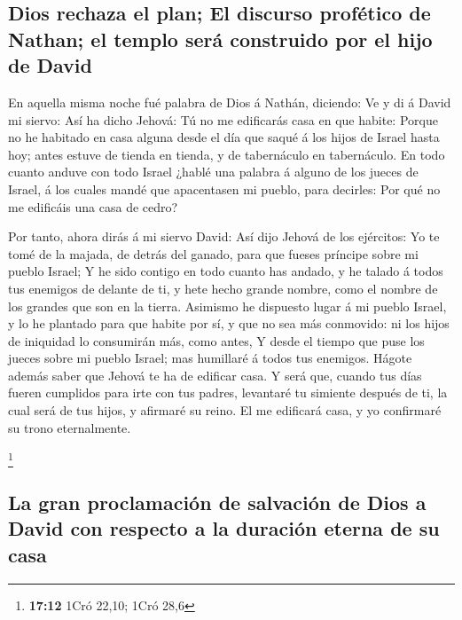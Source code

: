\hypertarget{dios-rechaza-el-plan-el-discurso-profuxe9tico-de-nathan-el-templo-seruxe1-construido-por-el-hijo-de-david}{%
\subsection{Dios rechaza el plan; El discurso profético de Nathan; el
templo será construido por el hijo de
David}\label{dios-rechaza-el-plan-el-discurso-profuxe9tico-de-nathan-el-templo-seruxe1-construido-por-el-hijo-de-david}}

 En aquella misma noche fué palabra de Dios á Nathán,
diciendo:  Ve y di á David mi siervo: Así ha dicho Jehová:
Tú no me edificarás casa en que habite:  Porque no he
habitado en casa alguna desde el día que saqué á los hijos de Israel
hasta hoy; antes estuve de tienda en tienda, y de tabernáculo en
tabernáculo.  En todo cuanto anduve con todo Israel ¿hablé
una palabra á alguno de los jueces de Israel, á los cuales mandé que
apacentasen mi pueblo, para decirles: Por qué no me edificáis una casa
de cedro?

 Por tanto, ahora dirás á mi siervo David: Así dijo Jehová
de los ejércitos: Yo te tomé de la majada, de detrás del ganado, para
que fueses príncipe sobre mi pueblo Israel;  Y he sido
contigo en todo cuanto has andado, y he talado á todos tus enemigos de
delante de ti, y hete hecho grande nombre, como el nombre de los grandes
que son en la tierra.  Asimismo he dispuesto lugar á mi
pueblo Israel, y lo he plantado para que habite por sí, y que no sea más
conmovido: ni los hijos de iniquidad lo consumirán más, como antes,
 Y desde el tiempo que puse los jueces sobre mi pueblo
Israel; mas humillaré á todos tus enemigos. Hágote además saber que
Jehová te ha de edificar casa.  Y será que, cuando tus días
fueren cumplidos para irte con tus padres, levantaré tu simiente después
de ti, la cual será de tus hijos, y afirmaré su reino.  El
me edificará casa, y yo confirmaré su trono eternalmente.

\footnote{\textbf{17:12} 1Cró 22,10; 1Cró 28,6}

\hypertarget{la-gran-proclamaciuxf3n-de-salvaciuxf3n-de-dios-a-david-con-respecto-a-la-duraciuxf3n-eterna-de-su-casa}{%
\subsection{La gran proclamación de salvación de Dios a David con
respecto a la duración eterna de su
casa}\label{la-gran-proclamaciuxf3n-de-salvaciuxf3n-de-dios-a-david-con-respecto-a-la-duraciuxf3n-eterna-de-su-casa}}


